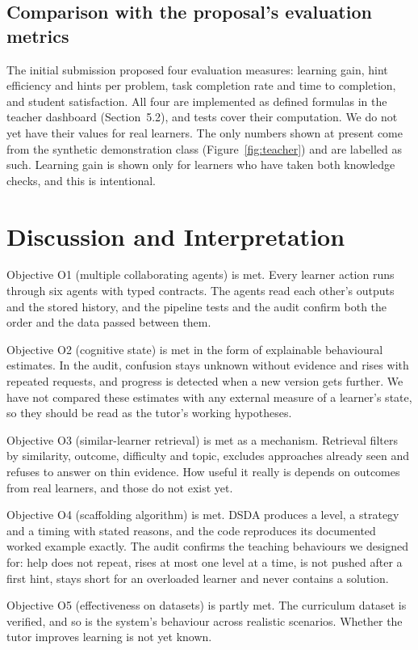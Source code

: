 \subsection{Comparison with the proposal's evaluation metrics}
The initial submission proposed four evaluation measures: learning gain, hint efficiency and hints per problem, task completion rate and time to completion, and student satisfaction. All four are implemented as defined formulas in the teacher dashboard (Section~5.2), and tests cover their computation. We do not yet have their values for real learners. The only numbers shown at present come from the synthetic demonstration class (Figure~\ref{fig:teacher}) and are labelled as such. Learning gain is shown only for learners who have taken both knowledge checks, and this is intentional.

\section{Discussion and Interpretation}
Objective O1 (multiple collaborating agents) is met. Every learner action runs through six agents with typed contracts. The agents read each other's outputs and the stored history, and the pipeline tests and the audit confirm both the order and the data passed between them.

Objective O2 (cognitive state) is met in the form of explainable behavioural estimates. In the audit, confusion stays unknown without evidence and rises with repeated requests, and progress is detected when a new version gets further. We have not compared these estimates with any external measure of a learner's state, so they should be read as the tutor's working hypotheses.

Objective O3 (similar-learner retrieval) is met as a mechanism. Retrieval filters by similarity, outcome, difficulty and topic, excludes approaches already seen and refuses to answer on thin evidence. How useful it really is depends on outcomes from real learners, and those do not exist yet.

Objective O4 (scaffolding algorithm) is met. DSDA produces a level, a strategy and a timing with stated reasons, and the code reproduces its documented worked example exactly. The audit confirms the teaching behaviours we designed for: help does not repeat, rises at most one level at a time, is not pushed after a first hint, stays short for an overloaded learner and never contains a solution.

Objective O5 (effectiveness on datasets) is partly met. The curriculum dataset is verified, and so is the system's behaviour across realistic scenarios. Whether the tutor improves learning is not yet known.

